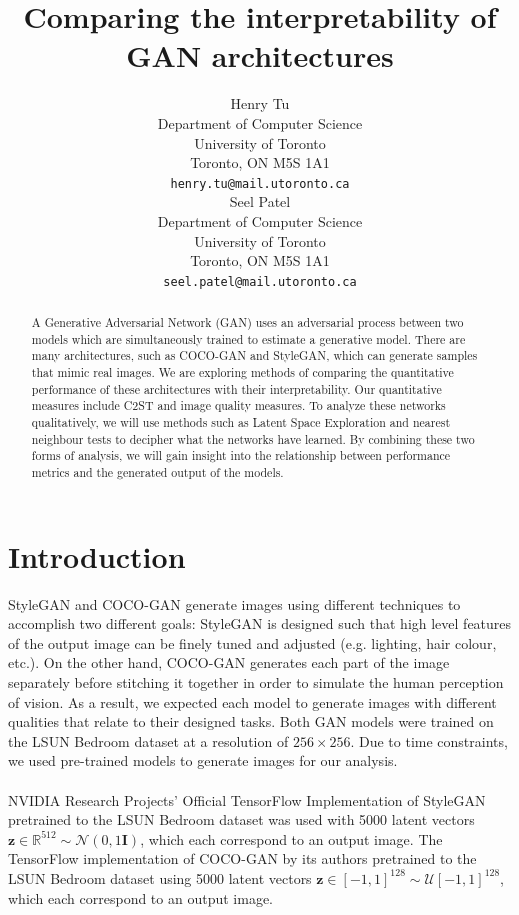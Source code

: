 \documentclass{article}
\title{Comparing the interpretability of GAN architectures}
\author{%
  Henry Tu \\
  Department of Computer Science\\
  University of Toronto\\
  Toronto, ON M5S 1A1 \\
  \texttt{henry.tu@mail.utoronto.ca} \\
   \And
     Seel Patel \\
  Department of Computer Science\\
  University of Toronto\\
  Toronto, ON M5S 1A1 \\
  \texttt{seel.patel@mail.utoronto.ca} \\
}
\begin{document}
\maketitle

\begin{abstract}
  A Generative Adversarial Network (GAN) uses an adversarial process between two models which are simultaneously trained to estimate a generative model.\cite{gan}
        There are many architectures, such as COCO-GAN\cite{cocogan} and StyleGAN\cite{stylegan}, which can generate samples that mimic real images.
        We are exploring methods of comparing the quantitative performance of these architectures with their interpretability.
        Our quantitative measures include C2ST\cite{evaluateGANs} and image quality measures\cite{evaluateGANs}.
        To analyze these networks qualitatively, we will use methods such as Latent Space Exploration\cite{sampleGAN} and nearest neighbour tests\cite{evaluateGANs} to decipher what the networks have learned.
        By combining these two forms of analysis, we will gain insight into the relationship between performance metrics and the generated output of the models.
\end{abstract}

\section{Introduction}

 StyleGAN and COCO-GAN generate images using different techniques to accomplish two different goals: StyleGAN is designed such that high level features of the output image can be finely tuned and adjusted (e.g. lighting, hair colour, etc.)\cite{stylegan}.
        On the other hand, COCO-GAN generates each part of the image separately before stitching it together in order to simulate the human perception of vision\cite{cocogan}.
        As a result, we expected each model to generate images with different qualities that relate to their designed tasks.
        Both GAN models were trained on the LSUN Bedroom dataset\cite{lsunBedroom} at a resolution of $256 \times 256$.
        Due to time constraints, we used pre-trained models to generate images for our analysis.
        \\\\
        NVIDIA Research Projects' Official TensorFlow Implementation of StyleGAN pretrained to the LSUN Bedroom dataset\cite{styleGANCode} was used with
        5000 latent vectors $\mathbf{z} \in \mathbb{R}^{512} \sim \mathcal{N}(0, 1\mathbf{I})$, which each correspond to an output image.
        The TensorFlow implementation of COCO-GAN by its authors pretrained to the LSUN Bedroom dataset\cite{cocogan} using
        5000 latent vectors $\mathbf{z} \in [-1, 1]^{128} \sim \mathcal{U}[-1, 1]^{128}$, which each correspond to an output image. 
\end{document}

